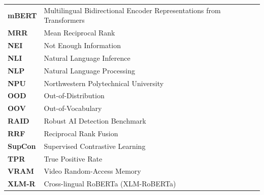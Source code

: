 \begin{center}
\begin{tabular}{lp{11.5cm}}
\textbf{mBERT}     & Multilingual Bidirectional Encoder Representations from Transformers \\
\textbf{MRR}       & Mean Reciprocal Rank \\
\textbf{NEI}       & Not Enough Information \\
\textbf{NLI}       & Natural Language Inference \\
\textbf{NLP}       & Natural Language Processing \\
\textbf{NPU}       & Northwestern Polytechnical University \\
\textbf{OOD}       & Out-of-Distribution \\
\textbf{OOV}       & Out-of-Vocabulary \\
\textbf{RAID}      & Robust AI Detection Benchmark \\
\textbf{RRF}       & Reciprocal Rank Fusion \\
\textbf{SupCon}    & Supervised Contrastive Learning \\
\textbf{TPR}       & True Positive Rate \\
\textbf{VRAM}      & Video Random-Access Memory \\
\textbf{XLM-R}     & Cross-lingual RoBERTa (XLM-RoBERTa) \\
\bottomrule
\end{tabular}
\end{center}
